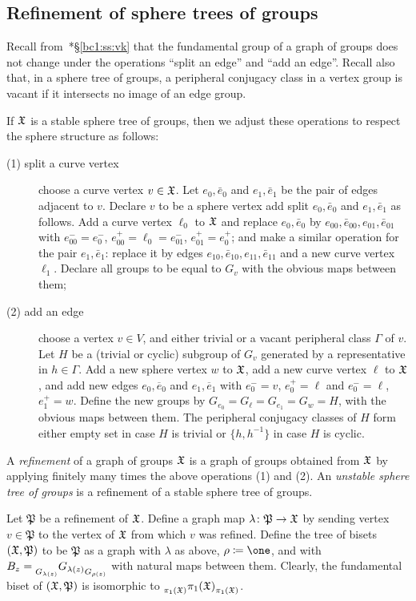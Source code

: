 \documentclass{amsart}
\begin{document}
\subsection{Refinement of sphere trees of groups}
Recall from~\cite{bartholdi-dudko:bc1}*{\S\ref{bc1:ss:vk}} that the
fundamental group of a graph of groups does not change under the
operations ``split an edge'' and ``add an edge''. Recall also that,
in a sphere tree of groups, a peripheral conjugacy class in a vertex
group is vacant if it intersects no image of an edge group.

If ${\mathfrak X}$ is a stable sphere tree of groups, then we adjust these
operations to respect the sphere structure as follows:
\begin{description}
\item[(1) split a curve vertex] choose a curve vertex $v\in {\mathfrak X}$. Let
  $e_0,\bar e_0$ and $e_1,\bar e_1$ be the pair of edges adjacent to
  $v$. Declare $v$ to be a sphere vertex add split $e_0,\bar e_0$ and
  $e_1,\bar e_1$ as follows. Add a curve vertex $\ell_0$ to ${\mathfrak X}$ and
  replace $e_0,\bar e_0$ by
  $e_{00},\bar e_{00},e_{01},\bar e_{01}$ with
  $e_{00}^-=e_0^-$, $e_{00}^+=\ell_0=e^-_{01}$, $e_{01}^+=e_0^+$; and make a similar operation for the pair $e_1,\bar e_1$: replace it by edges $e_{10},\bar e_{10},e_{11},\bar e_{11}$ and a new curve vertex $\ell_1$. Declare all groups to be
  equal to $G_v$ with the obvious maps between them;
\item[(2) add an edge] choose a vertex $v\in V$, and either trivial or
  a vacant peripheral class $\Gamma$ of $v$. Let $H$ be a (trivial or
  cyclic) subgroup of $G_v$ generated by a representative in
  $h\in \Gamma$. Add a new sphere vertex $w$ to ${\mathfrak X}$, add a new curve
  vertex $\ell$ to ${\mathfrak X}$, and add new edges $e_0,\overline e_0$ and
  $e_1,\overline e_1$ with $e_0^-=v$, $e_0^+=\ell$ and $e_0^-=\ell$,
  $e_1^+=w$. Define the new groups by
  $G_{e_0}=G_{\ell}=G_{e_1}=G_w=H$, with the obvious maps between
  them. The peripheral conjugacy classes of $H$ form either empty set in
  case $H$ is trivial or $\{h,h^{-1}\}$ in case $H$ is cyclic.
\end{description} 
A \emph{refinement} of a graph of groups ${\mathfrak X}$ is a graph of groups
obtained from ${\mathfrak X}$ by applying finitely many times the above
operations (1) and (2). An \emph{unstable sphere tree of groups} is a
refinement of a stable sphere tree of groups.

Let $\mathfrak P$ be a refinement of ${\mathfrak X}$. Define a graph map
$\lambda \colon \mathfrak P \to {\mathfrak X}$ by sending vertex
$v\in \mathfrak P$ to the vertex of ${\mathfrak X}$ from which $v$ was
refined. Define the tree of bisets $({\mathfrak X},\mathfrak P)$ to be
$ \mathfrak P$ as a graph with $\lambda$ as above,
$\rho\coloneqq \one$, and with
$B_z= \subscript{G_{\lambda(z)}} {G_{\lambda(z)}}_{G_{\rho(z)}}$ with natural
maps between them. Clearly, the fundamental biset of
$({\mathfrak X},\mathfrak P)$ is isomorphic to
$\subscript{\pi_1(\gf)}{\pi_1(\gf)}_{\pi_1(\gf)}$.
\end{document}
